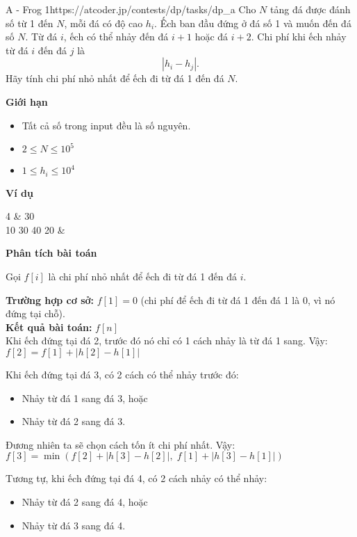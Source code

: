 \begin{baitap}{A - Frog 1}{https://atcoder.jp/contests/dp/tasks/dp\_a}
Cho $N$ tảng đá được đánh số từ 1 đến $N$, mỗi đá có độ cao $h_i$. 
Ếch ban đầu đứng ở đá số 1 và muốn đến đá số $N$. 
Từ đá $i$, ếch có thể nhảy đến đá $i+1$ hoặc đá $i+2$. 
Chi phí khi ếch nhảy từ đá $i$ đến đá $j$ là 
\[
    |h_i - h_j|.
\]
Hãy tính chi phí nhỏ nhất để ếch đi từ đá 1 đến đá $N$.

\textbf{Giới hạn}
\begin{itemize}
    \item Tất cả số trong input đều là số nguyên.
    \item $2 \leq N \leq 10^5$
    \item $1 \leq h_i \leq 10^4$
\end{itemize}

\textbf{Ví dụ}

\begin{sampleio}
4 & 30 \\ 
10 30 40 20 &  \\
\end{sampleio}

\end{baitap}

\textbf{Phân tích bài toán}

Gọi \( f[i] \) là chi phí nhỏ nhất để ếch đi từ đá 1 đến đá \( i \).

\textbf{Trường hợp cơ sở:} $f[1] = 0$ (chi phí để ếch đi từ đá 1 đến đá 1 là 0, vì nó đứng tại chỗ). \\

\textbf{Kết quả bài toán:} $f[n]$\\

Khi ếch đứng tại đá 2, trước đó nó chỉ có 1 cách nhảy là từ đá 1 sang.  
Vậy: $f[2] = f[1] + |h[2] - h[1]|$


Khi ếch đứng tại đá 3, có 2 cách có thể nhảy trước đó:

\begin{itemize}
    \item Nhảy từ đá 1 sang đá 3, hoặc
    \item Nhảy từ đá 2 sang đá 3.
\end{itemize}

Đương nhiên ta sẽ chọn cách tốn ít chi phí nhất.  
Vậy: $ f[3] = \min \left( f[2] + |h[3] - h[2]|, \; f[1] + |h[3] - h[1]| \right)$

Tương tự, khi ếch đứng tại đá 4, có 2 cách nhảy có thể nhảy:

\begin{itemize}
    \item Nhảy từ đá 2 sang đá 4, hoặc
    \item Nhảy từ đá 3 sang đá 4.
\end{itemize}

